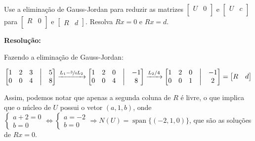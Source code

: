 \documentclass[leqno]{article}
\DeclareMathOperator{\spn}{span}
\begin{document}
\begin{enumerate}
    Use a eliminação de Gauss-Jordan para reduzir as matrizes $\begin{bmatrix}
    U & 0\\
    \end{bmatrix}$ e $\begin{bmatrix}
    U & c\\
    \end{bmatrix}$ para $\begin{bmatrix}
    R & 0\\
    \end{bmatrix}$ e $\begin{bmatrix}
    R & d
    \end{bmatrix}$. Resolva $Rx=0$ e $Rx=d$.
    
    \textbf{Resolução:}

    Fazendo a eliminação de Gauss-Jordan:
    
    \begin{align*}
        \begin{bmatrix}
        1 & 2 & 3 & \bigm| & 5\\
        0 & 0 & 4 & \bigm| & 8\\
        \end{bmatrix}\xrightarrow{L_1-\sfrac{3}{4}L_2}\begin{bmatrix}
        1 & 2 & 0 & \bigm| & -1\\
        0 & 0 & 4 & \bigm| & 8\\
        \end{bmatrix}\xrightarrow{L_2/4}\begin{bmatrix}
        1 & 2 & 0 & \bigm| & -1\\
        0 & 0 & 1 & \bigm| & 2\\
        \end{bmatrix}=\begin{bmatrix}
        R & d
        \end{bmatrix}
    \end{align*}
    
    Assim, podemos notar que apenas a segunda coluna de $R$ é livre, o que implica que o núcleo de $U$ possui o vetor $(a,1,b)$, onde $\begin{cases}a+2=0\\b=0\end{cases}\iff\begin{cases}a=-2\\b=0\end{cases}\Rightarrow N(U)=\spn\{(-2,1,0)\}$, que são as soluções de $Rx=0$.
    

\end{enumerate}
\end{document}
